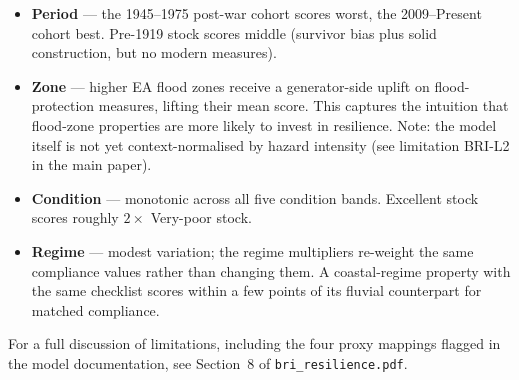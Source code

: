 \documentclass[11pt,a4paper]{article}
\begin{document}
\begin{itemize}
    \item \textbf{Period} --- the 1945--1975 post-war cohort scores worst, the
          2009--Present cohort best. Pre-1919 stock scores middle (survivor
          bias plus solid construction, but no modern measures).
    \item \textbf{Zone} --- higher EA flood zones receive a generator-side
          uplift on flood-protection measures, lifting their mean score. This
          captures the intuition that flood-zone properties are more likely
          to invest in resilience. Note: the model itself is not yet
          context-normalised by hazard intensity (see limitation BRI-L2 in
          the main paper).
    \item \textbf{Condition} --- monotonic across all five condition bands.
          Excellent stock scores roughly $2\times$ Very-poor stock.
    \item \textbf{Regime} --- modest variation; the regime multipliers
          re-weight the same compliance values rather than changing them. A
          coastal-regime property with the same checklist scores within a
          few points of its fluvial counterpart for matched compliance.
\end{itemize}

\noindent For a full discussion of limitations, including the four proxy
mappings flagged in the model documentation, see Section~8 of
\texttt{bri\_resilience.pdf}.
\end{document}
